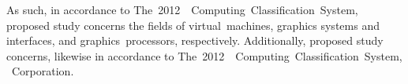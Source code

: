 As such, in accordance to The~2012~\dvttermacm ~Computing~Classification~System, proposed study concerns the fields of virtual~machines, graphics systems and interfaces,  and graphics~processors, respectively. Additionally, proposed study concerns, likewise in accordance to The~2012~\dvttermacm ~Computing~Classification~System, \dvttermintel ~Corporation.


